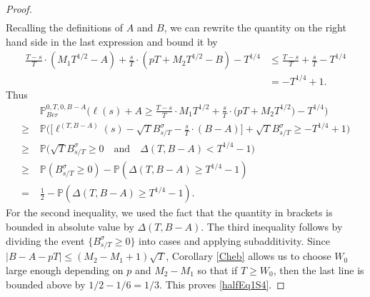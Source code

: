 \begin{proof}
\begin{align*}
	\end{align*}
	Recalling the definitions of $A$ and $B$, we can rewrite the quantity on the right hand side in the last expression and bound it by
	\begin{align*}
	\frac{T-s}{T}\cdot(M_1T^{1/2}-A) + \frac{s}{T}\cdot(pT + M_2T^{1/2} - B) - T^{1/4} &\leq  \frac{T-s}{T} + \frac{s}{T} - T^{1/4}\\
	& = -T^{1/4} + 1.
	\end{align*}
	Thus
	\begin{align*}
	&\mathbb{P}^{0,T,0,B-A}_{Ber}\Big( \ell(s) + A  \geq \frac{T-s}{T} \cdot M_1 T^{1/2} + \frac{s}{T} \cdot \big(p T + M_2 T^{1/2}\big) - T^{1/4} \Big)\\
	\geq \; & \mathbb{P}\Big( \Big[\ell^{(T,B-A)}(s) - \sqrt{T} B^\sigma_{s/T} - \frac{s}{T}\cdot(B-A)\Big] + \sqrt{T}B^\sigma_{s/T} \geq -T^{1/4} + 1 \Big)\\
	\geq \; & \mathbb{P}\Big( \sqrt{T}B^\sigma_{s/T} \geq 0 \quad \mathrm{and} \quad \Delta(T,B-A) < T^{1/4} - 1 \Big)\\
	\geq \; & \mathbb{P}\left( B^\sigma_{s/T} \geq 0 \right) - \mathbb{P}\left( \Delta(T,B-A) \geq T^{1/4} - 1 \right)\\
	= \; & \frac{1}{2} - \mathbb{P}\left( \Delta(T,B-A) \geq T^{1/4} - 1 \right).
	\end{align*}
	For the second inequality, we used the fact that the quantity in brackets is bounded in absolute value by $\Delta(T,B-A)$. The third inequality follows by dividing the event $\{B^\sigma_{s/T}\geq 0\}$ into cases and applying subadditivity. Since $|B-A-pT|\leq (M_2-M_1+1)\sqrt{T}$, Corollary \ref{Cheb} allows us to choose $W_0$ large enough depending on $p$ and $M_2-M_1$ so that if $T \geq W_0$, then the last line is bounded above by $1/2 - 1/6 = 1/3$. This proves \eqref{halfEq1S4}.
\end{proof}


